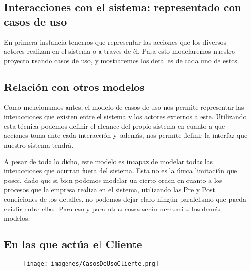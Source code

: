 \subsection{Interacciones con  el sistema: representado con casos de uso}

En primera instancia tenemos que representar las acciones que los diversos actores realizan en el sistema o a traves de él. Para esto modelaremos nuestro proyecto usando casos de uso, y
mostraremos los detalles de cada uno de estos.

\subsection{Relación con otros modelos}

Como mencionamos antes, el modelo de casos de uso nos permite representar las interacciones que existen entre
el sistema y los actores externos a este. Utilizando esta técnica podemos definir el alcance del propio sistema
en cuanto a que acciones toma ante cada interacción y, además, nos permite definir la interfaz que nuestro
sistema tendrá.

A pesar de todo lo dicho, este modelo es incapaz de modelar todas las interacciones que ocurran fuera del sistema.
Esta no es la única limitación que posee, dado que si bien podemos modelar un cierto orden en cuanto a los procesos
que la empresa realiza en el sistema, utilizando las Pre y Post condiciones de los detalles, no podemos dejar
claro ningún paralelismo que pueda existir entre ellas. Para eso y para otras cosas serán necesarios los demás modelos.

\subsection{En las que actúa el Cliente}

\begin{figure}[H]
    \texttt{[image: imagenes/CasosDeUsoCliente.png]}
\end{figure}

